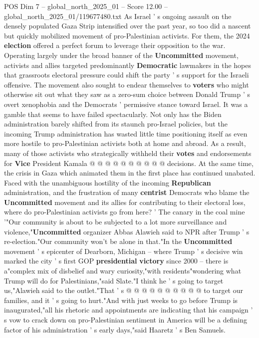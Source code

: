 \begin{textsample}{POS Dim 7 – global\_north\_2025\_01 – Score 12.00 – global\_north\_2025\_01/119677480.txt}  \label{ex:f7_pos_267}
As Israel ' s ongoing assault on the densely populated Gaza Strip intensified over the past year, so too did a nascent but quickly mobilized movement of pro-Palestinian activists.
For them, the 2024 \textbf{election} offered a perfect forum to leverage their opposition to the war.
Operating largely under the broad banner of the \textbf{Uncommitted} movement, activists and allies targeted predominantly \textbf{Democratic} lawmakers in the hopes that grassroots electoral pressure could shift the party ' s support for the Israeli offensive.
The movement also sought to endear themselves to \textbf{voters} who might otherwise sit out what they saw as a zero-sum choice between Donald Trump ' s overt xenophobia and the Democrats ' permissive stance toward Israel.
It was a gamble that seems to have failed spectacularly.
Not only has the Biden administration barely shifted from its staunch pro-Israel policies, but the incoming Trump administration has wasted little time positioning itself as even more hostile to pro-Palestinian activists both at home and abroad.
As a result, many of those activists who strategically withheld their \textbf{votes} and endorsements for \textbf{Vice} President Kamala @ @ @ @ @ @ @ @ @ @ decisions.
At the same time, the crisis in Gaza which animated them in the first place has continued unabated.
Faced with the unambiguous hostility of the incoming \textbf{Republican} administration, and the frustration of many \textbf{centrist} Democrats who blame the \textbf{Uncommitted} movement and its allies for contributing to their electoral loss, where do pro-Palestinian activists go from here? ' The canary in the coal mine '"Our community is about to be subjected to a lot more surveillance and violence,"\textbf{Uncommitted} organizer Abbas Alawieh said to NPR after Trump ' s re-election."Our community won't be alone in that."In the \textbf{Uncommitted} movement ' s epicenter of Dearborn, Michigan -- where Trump ' s decisive win marked the city ' s first GOP \textbf{presidential} \textbf{victory} since 2000 -- there is a"complex mix of disbelief and wary curiosity,"with residents"wondering what Trump will do for Palestinians,"said Slate."I think he ' s going to target us,"Alawieh said to the outlet."That ' s @ @ @ @ @ @ @ @ @ @ to target our families, and it ' s going to hurt."And with just weeks to go before Trump is inaugurated,"all his rhetoric and appointments are indicating that his campaign ' s vow to crack down on pro-Palestinian sentiment in America will be a defining factor of his administration ' s early days,"said Haaretz ' s Ben Samuels.

\end{textsample}
